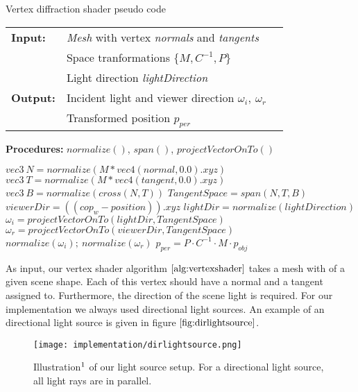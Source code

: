 \begin{algorithm}[H]
\caption{Vertex diffraction shader pseudo code}
\begin{table}[H]
  \begin{tabular}{@{}lll@{}}
    \textbf{Input:} & \emph{Mesh} with vertex \emph{normals} and \emph{tangents}  \\
    & Space tranformations $\{M, C^{-1}, P\}$  \\
    & Light direction \emph{lightDirection}  \\
    \textbf{Output:} & Incident light and viewer direction $\omega_i,\ \omega_r$ \\
    & Transformed position $p_{per}$ \\
  \end{tabular} 
\end{table}
\textbf{Procedures:} $normalize()$, $span()$, $projectVectorOnTo()$  \\
\setlength{\fboxrule}{0pt} 
\begin{boxedminipage}{1.0\textwidth}
  \begin{algorithmic}[1]
        \State $ vec3 \ N = normalize(M * vec4(normal,0.0).xyz)$
        \State $ vec3 \ T = normalize(M * vec4(tangent,0.0).xyz)$
        \State $ vec3 \ B = normalize(cross(N, T))$
        \State $ TangentSpace = span(N, T, B)$
        \State $ viewerDir = ((cop_{w}-position)).xyz$
        \State $ lightDir = normalize(lightDirection)$
        \State $ \omega_i = projectVectorOnTo(lightDir, TangentSpace)$
        \State $ \omega_r = projectVectorOnTo(viewerDir, TangentSpace)$
        \State $normalize(\omega_i); \ normalize(\omega_r)$
        \State $p_{per} = P \cdot C^{-1} \cdot M \cdot p_{obj}$
      \EndFor
  \end{algorithmic}
  \end{boxedminipage}
  \vskip1.5pt
\label{alg:vertexshader}
\end{algorithm}

As input, our vertex shader algorithm $\ref{alg:vertexshader}$ takes a mesh with of a given scene shape. Each of this vertex should have a normal and a tangent assigned to. Furthermore, the direction of the scene light is required. For our implementation we always used directional light sources. An example of an directional light source is given in figure $\ref{fig:dirlightsource}$. 

\begin{figure}[H]
  \centering
  \texttt{[image: implementation/dirlightsource.png]}
  \caption[Rays of a Directional Light]{Illustration$\footnotemark$ of our light source setup. For a directional light source, all light rays are in parallel.}
  \label{fig:dirlightsource}
\end{figure}


